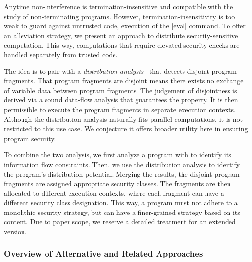 Anytime non-interference
is termination-insensitive
and compatible with the study of non-terminating programs. However, termination-insensitivity is too
weak to guard against untrusted code, \eg execution of the \prc|eval| command.
To offer an alleviation strategy, we present an approach to distribute
security-sensitive computation. This way, computations that require elevated
security checks are handled separately from trusted code.

The idea is to pair \lname with a \emph{distribution
analysis}~\cite{aubert20232} that detects disjoint program fragments. That
program fragments are disjoint means there exists no exchange of variable data
between program fragments. The judgement of disjointness is derived via a sound
data-flow analysis that guarantees the property. It is then permissible to
execute the program fragments in separate execution contexts. Although the
distribution analysis naturally fits parallel computations, it is not restricted
to this use case. We conjecture it offers broader utility here in ensuring
program security.

To combine the two analysis, we first analyze a program with \lname to identify
its information flow constraints. Then, we use the distribution analysis to
identify the program's distribution potential. Merging the results, the disjoint
program fragments are assigned appropriate security classes. The fragments are
then allocated to different execution contexts, where each fragment can have a
different security class designation. This way, a program must not adhere to a
monolithic security strategy, but can have a finer-grained strategy based on its
content. Due to paper scope, we reserve a detailed treatment for an extended
version.

\subsubsection{Overview of Alternative and Related Approaches}\label{sec:related-works}

